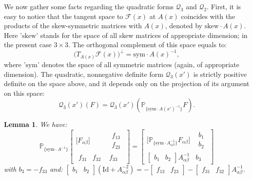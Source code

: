 \documentclass[leqno,twoside, 11pt]{amsart}
\theoremstyle{plain}
\newtheorem{lemma}[theorem]{Lemma}
\theoremstyle{definition}
\numberwithin{equation}{section}
\numberwithin{figure}{section}
\begin{document}
We now gather some facts regarding the quadratic forms $\mathcal{Q}_3$
and $\mathcal{Q}_2$. First, it is easy to notice that the tangent space
to $\mathcal{F}(x)$ at $A(x)$ coincides with the products of the skew-symmetric
matrices with $A(x)$, denoted by $\mbox{skew}\cdot A(x)$.
Here '$\mbox{skew}$' stands for the space of all skew matrices
of appropriate dimension; in the present case $3\times 3$.
The orthogonal complement of this space equals to:
$$\Big(T_{A(x)}\mathcal{F}(x)\Big)^{\perp} = \mbox{sym}\cdot A(x)^{-1},$$
where '$\mbox{sym}$' denotes the space of all symmetric matrices 
(again, of appropriate dimension).
The quadratic, nonnegative definite form $\mathcal{Q}_3(x')$ is strictly
positive definite on the space above, and it
depends only on the projection of its argument on this space:
\begin{equation}\label{r1}
\mathcal{Q}_3(x')(F) 
= \mathcal{Q}_3(x')\left(\mathbb{P}_{\{\mbox{sym}\cdot A(x')^{-1}\}} F\right).
\end{equation}
\begin{lemma}\label{lem1}
We have:
$$ \mathbb{P}_{\{\mathrm{sym}\cdot A^{-1}\}} 
\left[\begin{array}{cc} \Big[F_{\alpha\beta}\Big]
& \begin{array}{c} f_{13}\\ f_{23}\end{array}\\
\begin{array}{cc} f_{31} & f_{32}\end{array} & f_{33} \end{array}\right]
= \left[\begin{array}{cc} 
\Big[\mathbb{P}_{\{\mathrm{sym}\cdot A_{\alpha\beta}^{-1}\}} F_{\alpha\beta}\Big]
& \begin{array}{c} b_{1}\\ b_{2}\end{array}\\
\left[\begin{array}{cc} b_{1} &  b_{2} \end{array}\right] A_{\alpha\beta}^{-1}
& b_{3} \end{array}\right]$$
with $b_{3} = -f_{33}$ and:
$\left[\begin{array}{cc}b_{1}& b_{2}\end{array}\right] 
\left(\mathrm{Id} + A_{\alpha\beta}^{-2}\right)
= - \left[\begin{array}{cc}f_{13}& f_{23}\end{array}\right] 
- \left[\begin{array}{cc}f_{31}& f_{32}\end{array}\right] 
A_{\alpha\beta}^{-1} $.
\end{lemma}
\end{document}
